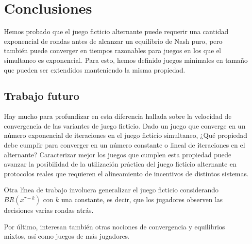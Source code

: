 \chapter{Conclusiones}  \label{cap:conclusiones}

Hemos probado que el juego ficticio alternante puede requerir una cantidad exponencial de rondas antes de alcanzar un equilibrio de Nash puro, pero también puede converger en tiempos razonables para juegos en los que el simultaneo es exponencial. Para esto, hemos definido juegos minimales en tamaño que pueden ser extendidos manteniendo la misma propiedad.

\section{Trabajo futuro} 

Hay mucho para profundizar en esta diferencia hallada sobre la velocidad de convergencia de las variantes de juego ficticio. Dado un juego que converge en un número exponencial de iteraciones en el juego ficticio simultaneo, ¿Qué propiedad debe cumplir para converger en un número constante o lineal de iteraciones en el alternante? Caracterizar mejor los juegos que cumplen esta propiedad puede avanzar la posibilidad de la utilización práctica del juego ficticio alternante en protocolos reales que requieren el alineamiento de incentivos de distintos sistemas.

Otra línea de trabajo involucra generalizar el juego ficticio considerando $BR(x^{\tau-k})$ con $k$ una constante, es decir, que los jugadores observen las decisiones varias rondas atrás.

Por último, interesan también otras nociones de convergencia y equilibrios mixtos, así como juegos de más jugadores.
